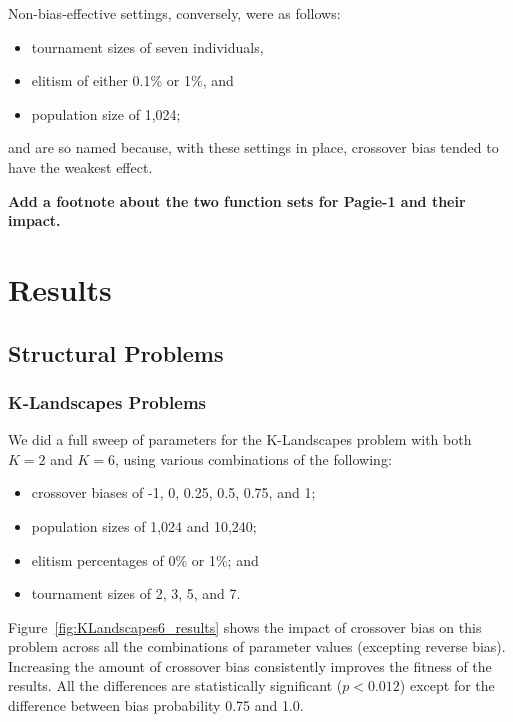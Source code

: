 \documentclass{sig-alternate}
\begin{document}
Non-bias-effective settings, conversely, were as follows:
\begin{itemize}
\item tournament sizes of seven individuals,
\item elitism of either 0.1\% or 1\%, and
\item population size of 1,024;
\end{itemize}
and are so named because, with these settings in place, crossover bias tended to have the weakest effect.

\textbf{Add a footnote about the two function sets for Pagie-1 and their impact.}

\section{Results} \label{sec:Results}

\subsection{Structural Problems}

\subsubsection{K-Landscapes Problems}

We did a full sweep of parameters for the K-Landscapes problem with both $K=2$ and $K=6$, using various combinations of the following:

\begin{itemize}
	\item crossover biases of -1, 0, 0.25, 0.5, 0.75, and 1;
	\item population sizes of 1,024 and 10,240;
	\item elitism percentages of 0\% or 1\%; and
	\item tournament sizes of 2, 3, 5, and 7.
\end{itemize}

Figure~\ref{fig:KLandscapes6_results} shows the impact of crossover bias on this problem across all the 
combinations of parameter values (excepting reverse bias). Increasing the amount of crossover bias consistently
improves the fitness of the results. All the differences are statistically significant ($p < 0.012$) except for the
difference between bias probability 0.75 and 1.0.

%
%
%
%
\end{document}
